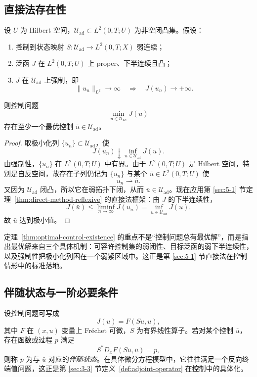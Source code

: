 \subsection{直接法存在性}

\begin{theorem}[最优控制问题的存在性]\label{thm:optimal-control-existence}
设 $U$ 为 Hilbert 空间，$\mathcal U_{\mathrm{ad}}\subset L^2(0,T;U)$ 为非空闭凸集。假设：
\begin{enumerate}
  \item 控制到状态映射 $S\colon \mathcal U_{\mathrm{ad}}\to L^2(0,T;X)$ 弱连续；
  \item 泛函 $J$ 在 $L^2(0,T;U)$ 上 proper、下半连续且凸；
  \item $J$ 在 $\mathcal U_{\mathrm{ad}}$ 上强制，即
  \[
  \|u_n\|_{L^2}\to\infty \quad\Longrightarrow\quad J(u_n)\to +\infty.
  \]
\end{enumerate}
则控制问题
\[
\min_{u\in \mathcal U_{\mathrm{ad}}} J(u)
\]
存在至少一个最优控制 $\bar u\in \mathcal U_{\mathrm{ad}}$。
\end{theorem}

\begin{proof}
取极小化列 $\{u_n\}\subset \mathcal U_{\mathrm{ad}}$，使
\[
J(u_n)\downarrow \inf_{u\in \mathcal U_{\mathrm{ad}}}J(u).
\]
由强制性，$\{u_n\}$ 在 $L^2(0,T;U)$ 中有界。由于 $L^2(0,T;U)$ 是 Hilbert 空间，特别是自反空间，故存在子列仍记为 $\{u_n\}$ 与某个 $\bar u\in L^2(0,T;U)$ 使
\[
u_n\rightharpoonup \bar u.
\]
又因为 $\mathcal U_{\mathrm{ad}}$ 闭凸，所以它在弱拓扑下闭，从而 $\bar u\in \mathcal U_{\mathrm{ad}}$。现在应用第 \ref{sec:5-1} 节定理~\ref{thm:direct-method-reflexive} 的直接法框架：由 $J$ 的下半连续性，
\[
J(\bar u)\le \liminf_{n\to\infty}J(u_n)=\inf_{u\in \mathcal U_{\mathrm{ad}}}J(u).
\]
故 $\bar u$ 达到极小值。
\end{proof}

\begin{remark}
定理~\ref{thm:optimal-control-existence} 的重点不是“控制问题总有最优解”，而是指出最优解来自三个具体机制：可容许控制集的弱闭性、目标泛函的弱下半连续性，以及强制性把极小化列困在一个弱紧区域中。这正是第 \ref{sec:5-1} 节直接法在控制情形中的标准落地。
\end{remark}

\subsection{伴随状态与一阶必要条件}

\begin{definition}[伴随状态]\label{def:adjoint-state-control}
设控制问题可写成
\[
J(u)=F(Su,u),
\]
其中 $F$ 在 $(x,u)$ 变量上 Fr\'echet 可微，$S$ 为有界线性算子。若对某个控制 $\bar u$，存在函数或过程 $p$ 满足
\[
S^\ast D_xF(S\bar u,\bar u)=p,
\]
则称 $p$ 为与 $\bar u$ 对应的\emph{伴随状态}。在具体微分方程模型中，它往往满足一个反向终端值问题，这正是第 \ref{sec:3-3} 节定义~\ref{def:adjoint-operator} 在控制中的具体化。
\end{definition}

